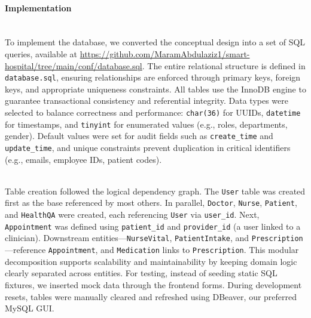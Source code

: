 \paragraph{Implementation}\mbox{}\\
To implement the database, we converted the conceptual design into a set of SQL queries, available at \url{https://github.com/MaramAbdulaziz1/smart-hospital/tree/main/conf/database.sql}. The entire relational structure is defined in \texttt{database.sql}, ensuring relationships are enforced through primary keys, foreign keys, and appropriate uniqueness constraints. All tables use the InnoDB engine to guarantee transactional consistency and referential integrity. Data types were selected to balance correctness and performance: \texttt{char(36)} for UUIDs, \texttt{datetime} for timestamps, and \texttt{tinyint} for enumerated values (e.g., roles, departments, gender). Default values were set for audit fields such as \texttt{create\_time} and \texttt{update\_time}, and unique constraints prevent duplication in critical identifiers (e.g., emails, employee IDs, patient codes).

\mbox{}\\
Table creation followed the logical dependency graph. The \texttt{User} table was created first as the base referenced by most others. In parallel, \texttt{Doctor}, \texttt{Nurse}, \texttt{Patient}, and \texttt{HealthQA} were created, each referencing \texttt{User} via \texttt{user\_id}. Next, \texttt{Appointment} was defined using \texttt{patient\_id} and \texttt{provider\_id} (a user linked to a clinician). Downstream entities—\texttt{NurseVital}, \texttt{PatientIntake}, and \texttt{Prescription}—reference \texttt{Appointment}, and \texttt{Medication} links to \texttt{Prescription}. This modular decomposition supports scalability and maintainability by keeping domain logic clearly separated across entities. For testing, instead of seeding static SQL fixtures, we inserted mock data through the frontend forms. During development resets, tables were manually cleared and refreshed using DBeaver, our preferred MySQL GUI.
